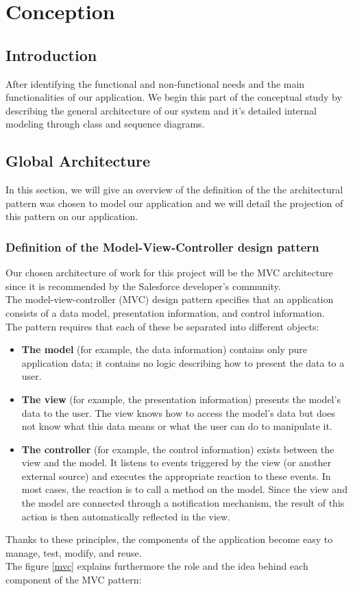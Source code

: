 \chapter{Conception}
\section*{Introduction}
After identifying the functional and non-functional needs and the main functionalities of our application. We begin this part
of the conceptual study by describing the general architecture of our system and
it's detailed internal modeling through class and sequence diagrams.
\section{Global Architecture}
In this section, we will give an overview of the definition of the
the architectural pattern was chosen to model our application and we will
detail the projection of this pattern on our application.

\subsection{Definition of the Model-View-Controller design pattern}
Our chosen architecture of work for this project will be the MVC  architecture since it is recommended by the Salesforce developer’s community.\\
The model-view-controller (MVC) design pattern specifies that an application consists of a data model, presentation information, and control information.\cite{5} \\
The pattern requires that each of these be separated into different objects:
\begin{itemize}
\item \textbf{The model} (for example, the data information) contains only pure application data; it contains no logic describing how to present the data to a user. 
\item \textbf{The view} (for example, the presentation information) presents the model's data to the user. The view knows how to access the model's data but does not know what this data means or what the user can do to manipulate it. 
\item \textbf{The controller} (for example, the control information) exists between the view and the model. It listens to events triggered by the view (or another external source) and executes the appropriate reaction to these events. In most cases, the reaction is to call a method on the model. Since the view and the model are connected through a notification mechanism, the result of this action is then automatically reflected in the view.\cite{5}
\end{itemize}
Thanks to these principles, the components of the application become easy to
manage, test, modify, and reuse.\\
The figure \ref{mvc} explains furthermore the role and the idea behind each component of the MVC pattern:

